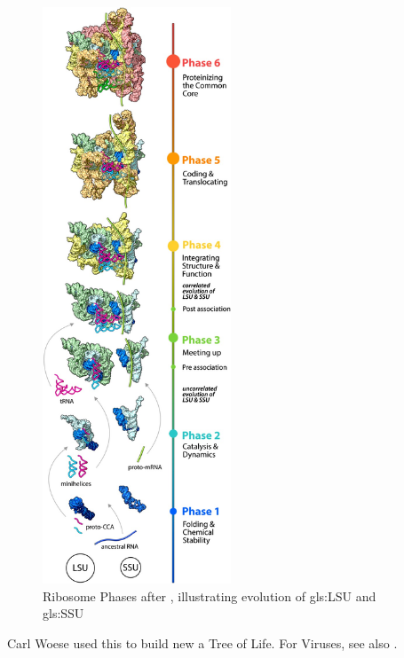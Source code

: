 \documentclass[]{article}
\begin{document}
\begin{figure}[H]
	\caption[Ribosome Phases]{Ribosome Phases after \cite{petrov2015history}, illustrating evolution of  \gls{gls:LSU} and \gls{gls:SSU}}\label{fig:RibosomePhases} 
	\includegraphics[width=0.5\textwidth]{RibosomePhases}
\end{figure}

Carl Woese used this to build new a Tree of Life. For Viruses, see also \cite{harris2021place}.
\end{document}
